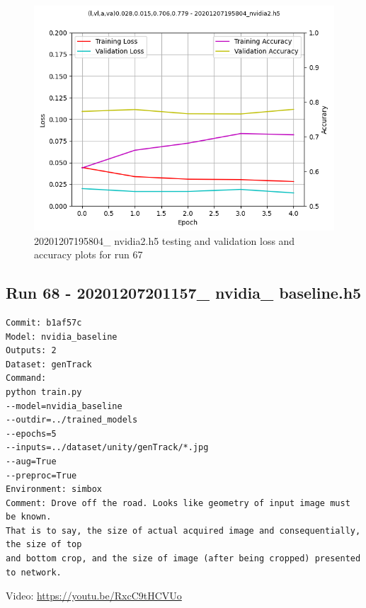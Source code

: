 \begin{figure}[h!]
\centering
\includegraphics[width=\textwidth]{Figures/20201207195804_nvidia2_accuracy.png}
\caption{20201207195804\_ nvidia2.h5 testing and validation loss and accuracy plots for run 67}
\label{fig:20201207195804_nvidia2_accuracy}
\end{figure}

\subsection{Run 68 - 20201207201157\_ nvidia\_ baseline.h5 }
\label{app_res:68}
\begin{verbatim}
Commit: b1af57c
Model: nvidia_baseline
Outputs: 2
Dataset: genTrack
Command:
python train.py
--model=nvidia_baseline
--outdir=../trained_models
--epochs=5
--inputs=../dataset/unity/genTrack/*.jpg
--aug=True
--preproc=True
Environment: simbox
Comment: Drove off the road. Looks like geometry of input image must be known.  
That is to say, the size of actual acquired image and consequentially, the size of top 
and bottom crop, and the size of image (after being cropped) presented to network.
\end{verbatim}
Video: \url{https://youtu.be/RxcC9tHCVUo}



